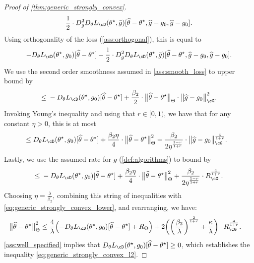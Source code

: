 \documentclass[11pt]{article} %
\newcommand{\pref}[1]{\cref{#1}}
\newcommand{\pfref}[1]{Proof of \pref{#1}}
\theoremstyle{theorem}  %
\theoremstyle{plain}
\DeclarePairedDelimiter{\prn}{(}{)}
\DeclarePairedDelimiter{\nrm}{\|}{\|}
\newcommand{\wh}[1]{\widehat{#1}}
\newenvironment{revone}{\color{black}}{\ignorespacesafterend}
\newcommand{\poprisk}{L_{\cD}}
\newcommand{\estone}{\wh{g}}
\newcommand{\esttwo}{\wh{\theta}}
\newcommand{\nuisance}{\cG}
\newcommand{\target}{\Theta}
\newcommand{\besttwo}{\theta^{\star}}
\newcommand{\gtone}{g_0}
\begin{document}
\begin{revone}
\begin{proof}[\pfref{thm:generic_strongly_convex}]
\begin{align*}
  \frac{1}{2}\cdot{}D^{2}_{g}D_{\theta}\poprisk(\besttwo,\bar{g})[\esttwo-\besttwo,\estone-\gtone,\estone-\gtone].
  \end{align*}
  Using orthogonality of the loss (\pref{ass:orthogonal}), this is equal to
  \begin{align*}
- D_{\theta}\poprisk(\besttwo,\gtone)[\esttwo-\besttwo] 
- \frac{1}{2}\cdot{}D^{2}_{g}D_{\theta}\poprisk(\besttwo,\bar{g})[\esttwo-\besttwo,\estone-\gtone,\estone-\gtone].
  \end{align*}
We use the second order smoothness assumed in \pref{ass:smooth_loss}
to upper bound by
\begin{align*}
\leq{}
- D_{\theta}\poprisk(\besttwo,\gtone)[\esttwo-\besttwo] 
+ \frac{\beta_2}{2}\cdot{}\nrm[\big]{\esttwo-\besttwo}_{\target}\cdot\nrm[\big]{\estone-\gtone}_{\nuisance}^{2}.
\end{align*}
Invoking Young's inequality and using that $r\in[0,1)$, we have that
for any constant $\eta>0$, this is at most
\begin{align*}
&\leq{}
D_{\theta}\poprisk(\besttwo,\gtone)[\esttwo-\besttwo]
                                                                                                                + \frac{\beta_2 \eta}{4}\cdot{}\nrm[\big]{\esttwo-\besttwo}_{\target}^{2}
+ \frac{\beta_2}{2\eta^{\frac{1-r}{1+r}}}\cdot{}\nrm[\big]{\estone-\gtone}_{\nuisance}^{\frac{4}{1+r}}.
\end{align*}
Lastly, we use the assumed rate for $\estone$
(\pref{def:algorithms}) to bound by
\begin{align*}
  \leq{}
 - D_{\theta}\poprisk(\besttwo,\gtone)[\esttwo-\besttwo] 
 + \frac{\beta_2
    \eta}{4}\cdot{}\nrm[\big]{\esttwo-\besttwo}_{\target}^{2} + \frac{\beta_2}{2\eta^{\frac{1-r}{1+r}}}\cdot{}
R_{\cG}^{\frac{4}{1+r}}.
\end{align*}
Choosing $\eta = \frac{\lambda}{\beta_2}$, combining this string of inequalities with \pref{eq:generic_strongly_convex_lower}, and rearranging, we have:
\begin{equation}
\label{eq:strongly_convex_quadratic}
\begin{aligned}
\nrm[\big]{\esttwo-\besttwo}_{\target}^{2} 
&\leq \frac{4}{\lambda}\prn*{- D_{\theta}\poprisk(\besttwo,\gtone)[\esttwo-\besttwo] 
+ R_{\Theta}} +
2\prn[\bigg]{\prn[\bigg]{\frac{\beta_2}{\lambda}}^{\frac{2}{1+r}} + \frac{\kappa}{\lambda}}\cdot R_{\cG}^{\frac{4}{1+r}}.
\end{aligned}
\end{equation}
\pref{ass:well_specified} implies that $D_{\theta}L_{\cD}(\besttwo,\gtone)[\esttwo-\besttwo]\geq{}0$, which establishes the inequality \pref{eq:generic_strongly_convex_l2}. 


\end{proof}
\end{revone}
\end{document}

